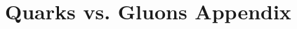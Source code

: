 \documentclass[a4paper, twoside, nobib]{tufte-book}
\begin{document}





\appendix

% 


\chapter{Quarks vs. Gluons Appendix}


\backmatter


% 


\printindex
\end{document}
